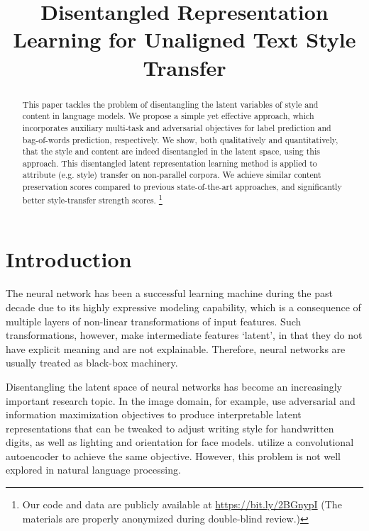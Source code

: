 \documentclass[letterpaper]{article} %
\title{Disentangled Representation Learning for Unaligned Text Style Transfer}
\date{}
\newcommand{\citeay}[1]{\citeauthor{#1} \shortcite{#1}}
\begin{document}
\maketitle
\graphicspath{{images/}}

\begin{abstract}
	This paper tackles the problem of disentangling the latent variables of style and content in language models.
	We propose a simple yet effective approach, which incorporates auxiliary multi-task and adversarial objectives for label prediction and bag-of-words prediction, respectively.
	We show, both qualitatively and quantitatively, that the style and content are indeed disentangled in the latent space, using this approach.
	This disentangled latent representation learning method is applied to attribute (e.g. style) transfer on non-parallel corpora.
	We achieve similar content preservation scores compared to previous state-of-the-art approaches, and significantly better style-transfer strength scores.
	\footnote{Our code and data are publicly available at \url{https://bit.ly/2BGnypI} (The materials are properly anonymized during double-blind review.)}
\end{abstract}

% 


\section{Introduction}

The neural network has been a successful learning machine during the past decade due to its highly expressive modeling capability, which is a consequence of multiple layers of non-linear transformations of input features.
Such transformations, however, make intermediate features `latent', in that they do not have explicit meaning and are not explainable.
Therefore, neural networks are usually treated as black-box machinery.

Disentangling the latent space of neural networks has become an increasingly important research topic.
In the image domain, for example, \citeay{chen2016infogan} use adversarial and information maximization objectives to produce interpretable latent representations that can be tweaked to adjust writing style for handwritten digits, as well as lighting and orientation for face models.
\citeay{mathieu2016disentangling} utilize a convolutional autoencoder to achieve the same objective.
However, this problem is not well explored in natural language processing.
\end{document}
